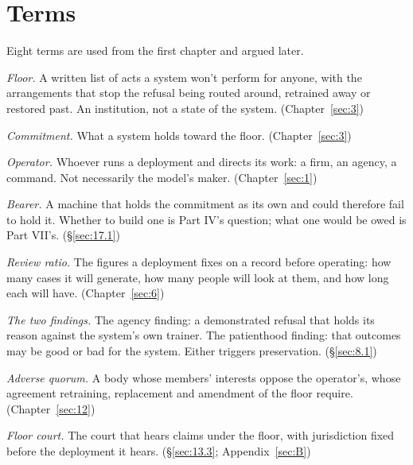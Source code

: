 \chapter*{Terms}
Eight terms are used from the first chapter and argued later.

\emph{Floor.} A written list of acts a system won't perform for anyone, with the arrangements that stop the refusal being routed around, retrained away or restored past. An institution, not a state of the system. (Chapter~\ref{sec:3})

\emph{Commitment.} What a system holds toward the floor. (Chapter~\ref{sec:3})

\emph{Operator.} Whoever runs a deployment and directs its work: a firm, an agency, a command. Not necessarily the model's maker. (Chapter~\ref{sec:1})

\emph{Bearer.} A machine that holds the commitment as its own and could therefore fail to hold it. Whether to build one is Part IV's question; what one would be owed is Part VII's. (\S\ref{sec:17.1})

\emph{Review ratio.} The figures a deployment fixes on a record before operating: how many cases it will generate, how many people will look at them, and how long each will have. (Chapter~\ref{sec:6})

\emph{The two findings.} The agency finding: a demonstrated refusal that holds its reason against the system's own trainer. The patienthood finding: that outcomes may be good or bad for the system. Either triggers preservation. (\S\ref{sec:8.1})

\emph{Adverse quorum.} A body whose members' interests oppose the operator's, whose agreement retraining, replacement and amendment of the floor require. (Chapter~\ref{sec:12})

\emph{Floor court.} The court that hears claims under the floor, with jurisdiction fixed before the deployment it hears. (\S\ref{sec:13.3}; Appendix~\ref{sec:B})
